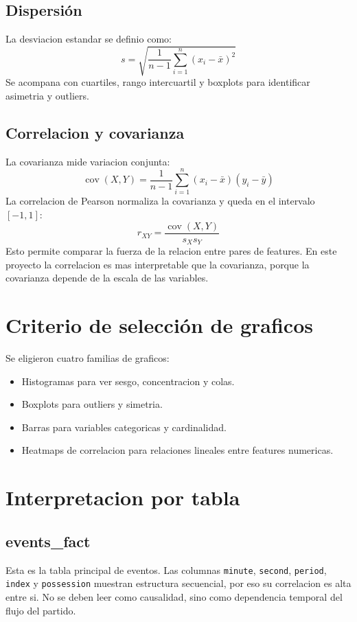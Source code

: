 \documentclass[12pt,a4paper]{article}
\begin{document}
\subsection{Dispersión}
La desviacion estandar se definio como:
\[
s = \sqrt{\frac{1}{n-1}\sum_{i=1}^{n}(x_i-\bar{x})^2}
\]
Se acompana con cuartiles, rango intercuartil y boxplots para identificar asimetria y outliers.

\subsection{Correlacion y covarianza}
La covarianza mide variacion conjunta:
\[
\operatorname{cov}(X,Y)=\frac{1}{n-1}\sum_{i=1}^{n}(x_i-\bar{x})(y_i-\bar{y})
\]
La correlacion de Pearson normaliza la covarianza y queda en el intervalo $[-1,1]$:
\[
r_{XY}=\frac{\operatorname{cov}(X,Y)}{s_X s_Y}
\]
Esto permite comparar la fuerza de la relacion entre pares de features. En este proyecto la correlacion es mas interpretable que la covarianza, porque la covarianza depende de la escala de las variables.

\section{Criterio de selección de graficos}
Se eligieron cuatro familias de graficos:
\begin{itemize}
  \item Histogramas para ver sesgo, concentracion y colas.
  \item Boxplots para outliers y simetria.
  \item Barras para variables categoricas y cardinalidad.
  \item Heatmaps de correlacion para relaciones lineales entre features numericas.
\end{itemize}

\section{Interpretacion por tabla}

\subsection{events\_fact}
Esta es la tabla principal de eventos. Las columnas \texttt{minute}, \texttt{second}, \texttt{period}, \texttt{index} y \texttt{possession} muestran estructura secuencial, por eso su correlacion es alta entre si. No se deben leer como causalidad, sino como dependencia temporal del flujo del partido.
\end{document}
